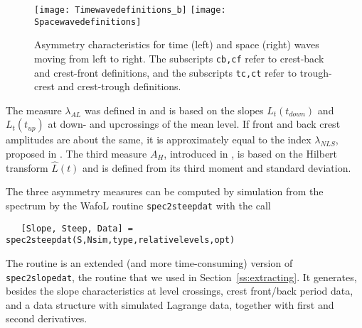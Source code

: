 \begin{figure}[tbh]
\centerline{
\texttt{[image: Timewavedefinitions\_b]}
\texttt{[image: Spacewavedefinitions]}
}
\caption{Asymmetry characteristics for time (left) and space (right) waves moving from left to right.
The subscripts {\tt cb,cf} refer to crest-back and crest-front definitions,
and the subscripts {\tt tc,ct} refer to trough-crest and crest-trough definitions.}
\label{FigDefinitions}
\end{figure}

The measure $\lambda_{AL}$ was defined in \cite{LindgrenAndAberg2009First} and is based on
the slopes $L_t(t_{down})$ and $L_t(t_{up})$ at down- and upcrossings of the mean level.
If front and back crest amplitudes are about the same, it is approximately equal to the index
$\lambda_{NLS}$, proposed in \cite{NiedzweckiEtal1999}. The third measure $A_H$, introduced 
in \cite{LeykinEtal1995}, is based on the Hilbert transform $\widehat L (t)$ and is defined from 
its third moment and standard deviation.

The three asymmetry measures can be computed by simulation from the spectrum by the
{\sc Wafo}L routine {\tt spec2steepdat} with the call
{\small\begin{verbatim}
   [Slope, Steep, Data] = spec2steepdat(S,Nsim,type,relativelevels,opt)
\end{verbatim}
}
\noindent
The routine is an extended (and more time-consuming) version of  {\tt spec2slopedat}, the routine
that we used in Section~\ref{ss:extracting}.
It generates, besides the slope characteristics at level crossings, crest front/back period data, and a data structure with simulated Lagrange data, together with first and second derivatives.

